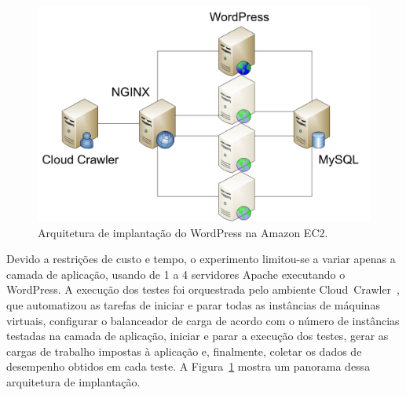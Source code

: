 \documentclass[12pt]{article}
\begin{document}

\begin{figure}[t]
  \begin{center}
    \includegraphics[trim = 20mm 5mm 20mm 10mm, scale=0.35]{img/ImplantacaoWordPress}
  \end{center}
  \caption{\label{fig:implantacao}Arquitetura de implantação do WordPress na Amazon EC2.}
\end{figure}

Devido a restrições de custo e tempo, o experimento limitou-se a variar 
apenas a camada de aplicação, usando de 1 a 4 servidores Apache executando o WordPress. 
A execução dos testes foi orquestrada pelo ambiente Cloud~Crawler~\cite{cunhacloud,cunha2013b},
que automatizou as tarefas de iniciar e parar todas as instâncias de máquinas virtuais, configurar 
o balanceador de carga de acordo com o número de instâncias testadas na camada de 
aplicação, iniciar e parar a execução dos testes, gerar as cargas de trabalho impostas à aplicação e, finalmente, coletar os dados de desempenho obtidos em cada teste. A Figura~\ref{fig:implantacao} mostra um panorama dessa arquitetura de implantação.
\end{document}
